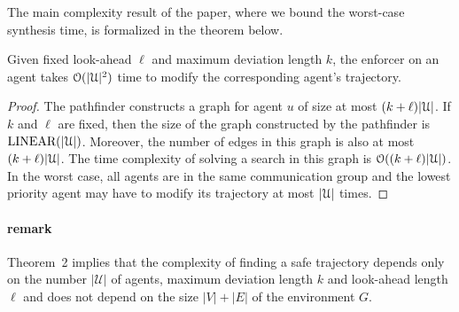 \noindent The main complexity result of the paper, where we bound the worst-case synthesis time, is formalized in the theorem below.
\begin{thm}
Given fixed look-ahead $\ell$ and maximum deviation length $k$, the enforcer on an agent takes $\mathcal{O}(|\mathcal{U}|^2)$ time to modify the corresponding agent's trajectory. 
\end{thm}
\begin{proof}
The pathfinder constructs a graph for agent $u$ of size at most $(k+\ell) |\mathcal{U}|$. If $k$ and $\ell$ are fixed, then the size of the graph constructed by the pathfinder is $\text{LINEAR}(|\mathcal{U}|)$. Moreover, the number of edges in this graph is also at most $(k+\ell)|\mathcal{U}|$. The time complexity of solving a search in this graph is $\mathcal{O}((k+\ell)|\mathcal{U}|)$. In the worst case, all agents are in the same communication group and the lowest priority agent may have to modify its trajectory at most $|\mathcal{U}|$ times. %
\end{proof}
\paragraph{remark} Theorem~2 implies that the complexity of finding a safe trajectory depends only on the number $|\mathcal{U}|$ of agents, maximum deviation length $k$ and look-ahead length $\ell$ and does not depend on the size $|V|+|E|$ of the environment $G$. 
